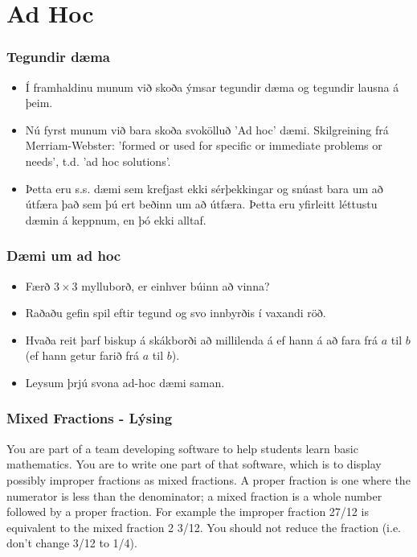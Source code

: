 \documentclass{beamer}
\begin{document}
\section[Ad Hoc]{Ad Hoc}

\begin{frame}
\frametitle{Tegundir dæma}

\begin{itemize}

\item<1-> Í framhaldinu munum við skoða ýmsar tegundir dæma og tegundir lausna á þeim.

\item<2-> Nú fyrst munum við bara skoða svokölluð 'Ad hoc' dæmi. Skilgreining frá Merriam-Webster:  'formed or used for specific or immediate problems or needs', t.d. 'ad hoc solutions'.

\item<3-> Þetta eru s.s. dæmi sem krefjast ekki sérþekkingar og snúast bara um að útfæra það sem þú ert beðinn um að útfæra. Þetta eru yfirleitt léttustu dæmin á keppnum, en þó ekki alltaf.

\end{itemize}

\end{frame}

\begin{frame}
\frametitle{Dæmi um ad hoc}

\begin{itemize}

\item<1-> Færð $3\times3$ mylluborð, er einhver búinn að vinna?

\item<2-> Raðaðu gefin spil eftir tegund og svo innbyrðis í vaxandi röð.

\item<3-> Hvaða reit þarf biskup á skákborði að millilenda á ef hann á að fara frá $a$ til $b$ (ef hann getur farið frá $a$ til $b$).

\item<4-> Leysum þrjú svona ad-hoc dæmi saman.

\end{itemize}

\end{frame}

\begin{frame}
\frametitle{Mixed Fractions - Lýsing}
\begin{small}
You are part of a team developing software to help students learn basic mathematics. You are to write one part of that software, which is to display possibly improper fractions as mixed fractions. A proper fraction is one where the numerator is less than the denominator; a mixed fraction is a whole number followed by a proper fraction. For example the improper fraction 27/12 is equivalent to the mixed fraction 2 3/12. You should not reduce the fraction (i.e. don’t change 3/12 to 1/4).
\end{small}
\end{frame}
\end{document}
